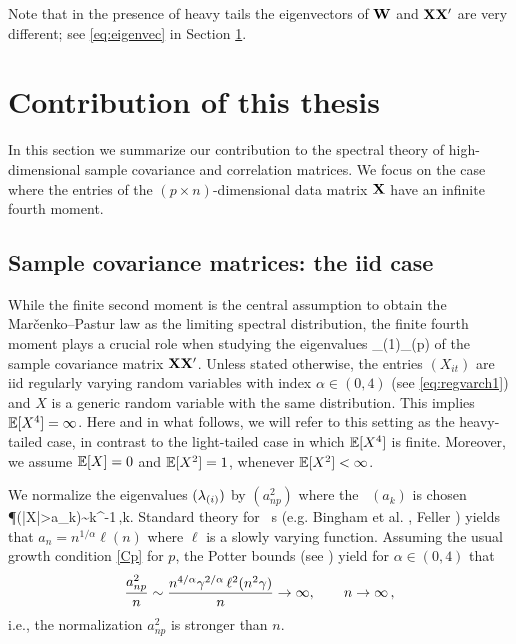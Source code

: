 Note that in the presence of heavy tails the eigenvectors of ${\mathbf W}$ and ${\mathbf X}{\mathbf X}'$ are very different; see \eqref{eq:eigenvec} in Section \ref{sec:contr}.






\section{Contribution of this thesis}\label{sec:contr}

In this section we summarize our contribution to the spectral theory of high-dimensional sample covariance and correlation matrices. We focus on the case where the entries of the $(p\times n)$-dimensional data matrix ${\mathbf X}$ have an infinite fourth moment. 

\subsection{Sample covariance matrices: the iid case}

While the finite second moment is the central assumption to obtain the Mar\v cenko--Pastur law as the limiting spectral distribution, the finite fourth moment plays a crucial role when studying the eigenvalues
\beam\label{eq:orderch1}
\la_{(1)}\ge \cdots \ge \la_{(p)}
\eeam
of the sample covariance matrix ${\mathbf X}{\mathbf X}'$. 
Unless stated otherwise, the entries $(X_{it})$ are iid regularly varying random variables with index $\alpha\in (0,4)$ (see \eqref{eq:regvarch1}) and $X$ is a generic random variable with the same distribution. This implies $\mathbb{E}[X^4]=\infty$. Here and in what follows, we will refer to this setting as the heavy-tailed case, in contrast to the light-tailed case in which $\mathbb{E}[X^4]$ is finite. Moreover, we assume $\mathbb{E}[X]=0$ and $\mathbb{E}[X^2]=1$, whenever $\mathbb{E}[X^2]<\infty$. 

We normalize the eigenvalues $(\lambda_{(i)})$ by $(a_{np}^2)$ where the \seq\
$(a_k)$ is chosen \sth 
\beao
\P(|X|>a_k)\sim k^{-1}\,,\quad k\to\infty.
\eeao
Standard theory for \regvary\ \fct s (e.g. Bingham et al. \cite{bingham:goldie:teugels:1987}, Feller \cite{feller}) yields that $a_n=n^{1/\alpha} \ell(n)$ where $\ell$ is a slowly varying function.
Assuming the usual growth condition \eqref{Cp} for $p$,
the Potter bounds (see \cite[p.~25]{bingham:goldie:teugels:1987}) yield for $\alpha\in (0,4)$ that
\begin{equation}\label{eq:toinfch1}
 \frac{a_{np}^2}{n} \sim \frac{n^{4/\alpha} \gamma^{2/\alpha}\,\ell^2(n^2 \gamma)}{n} \to \infty, \qquad n \to \infty\,,
\end{equation}
i.e., the normalization $a_{np}^2$ is stronger than $n$.

